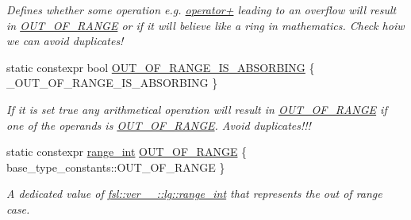 \begin{DoxyCompactItemize}
\begin{DoxyCompactList}\small\item\em Defines whether some operation e.\+g. \mbox{\hyperlink{classfsl_1_1ver__1__0_1_1lg_1_1range__int_a6ca845f4b8e8805cba8037d1fd9c4200}{operator+}} leading to an overflow will result in \mbox{\hyperlink{classfsl_1_1ver__1__0_1_1lg_1_1range__int_a4262605b56b8b319c33b0d1ccb190a82}{O\+U\+T\+\_\+\+O\+F\+\_\+\+R\+A\+N\+GE}} or if it will believe like a ring in mathematics. Check hoiw we can avoid duplicates! \end{DoxyCompactList}\item 
\mbox{\label{classfsl_1_1ver__1__0_1_1lg_1_1range__int_a9c54a07e64cbbbdfd206c68bc15caf54}} 
static constexpr bool \mbox{\hyperlink{classfsl_1_1ver__1__0_1_1lg_1_1range__int_a9c54a07e64cbbbdfd206c68bc15caf54}{O\+U\+T\+\_\+\+O\+F\+\_\+\+R\+A\+N\+G\+E\+\_\+\+I\+S\+\_\+\+A\+B\+S\+O\+R\+B\+I\+NG}} \{ \+\_\+\+O\+U\+T\+\_\+\+O\+F\+\_\+\+R\+A\+N\+G\+E\+\_\+\+I\+S\+\_\+\+A\+B\+S\+O\+R\+B\+I\+NG \}
\begin{DoxyCompactList}\small\item\em If it is set true any arithmetical operation will result in \mbox{\hyperlink{classfsl_1_1ver__1__0_1_1lg_1_1range__int_a4262605b56b8b319c33b0d1ccb190a82}{O\+U\+T\+\_\+\+O\+F\+\_\+\+R\+A\+N\+GE}} if one of the operands is \mbox{\hyperlink{classfsl_1_1ver__1__0_1_1lg_1_1range__int_a4262605b56b8b319c33b0d1ccb190a82}{O\+U\+T\+\_\+\+O\+F\+\_\+\+R\+A\+N\+GE}}. Avoid duplicates!!! \end{DoxyCompactList}\item 
\mbox{\label{classfsl_1_1ver__1__0_1_1lg_1_1range__int_a4262605b56b8b319c33b0d1ccb190a82}} 
static constexpr \mbox{\hyperlink{classfsl_1_1ver__1__0_1_1lg_1_1range__int}{range\+\_\+int}} \mbox{\hyperlink{classfsl_1_1ver__1__0_1_1lg_1_1range__int_a4262605b56b8b319c33b0d1ccb190a82}{O\+U\+T\+\_\+\+O\+F\+\_\+\+R\+A\+N\+GE}} \{ base\+\_\+type\+\_\+constants\+::\+O\+U\+T\+\_\+\+O\+F\+\_\+\+R\+A\+N\+GE \}
\begin{DoxyCompactList}\small\item\em A dedicated value of \mbox{\hyperlink{classfsl_1_1ver__1__0_1_1lg_1_1range__int}{fsl\+::ver\+\_\+\_\+::lg\+::range\+\_\+int}} that represents the out of range case. \end{DoxyCompactList}\end{DoxyCompactItemize}


